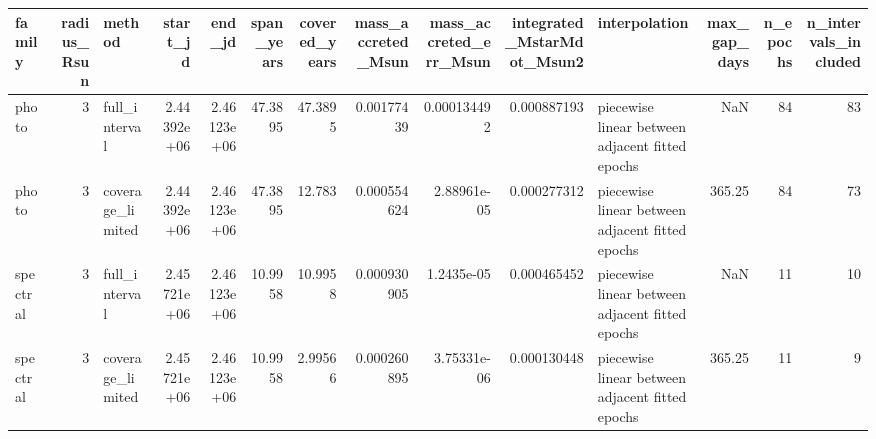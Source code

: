 \begin{tabular}{lrlrrrrrrrlrrr}
\toprule
family & radius_Rsun & method & start_jd & end_jd & span_years & covered_years & mass_accreted_Msun & mass_accreted_err_Msun & integrated_MstarMdot_Msun2 & interpolation & max_gap_days & n_epochs & n_intervals_included \\
\midrule
photo & 3 & full_interval & 2.44392e+06 & 2.46123e+06 & 47.3895 & 47.3895 & 0.00177439 & 0.000134492 & 0.000887193 & piecewise linear between adjacent fitted epochs & NaN & 84 & 83 \\
photo & 3 & coverage_limited & 2.44392e+06 & 2.46123e+06 & 47.3895 & 12.783 & 0.000554624 & 2.88961e-05 & 0.000277312 & piecewise linear between adjacent fitted epochs & 365.25 & 84 & 73 \\
spectral & 3 & full_interval & 2.45721e+06 & 2.46123e+06 & 10.9958 & 10.9958 & 0.000930905 & 1.2435e-05 & 0.000465452 & piecewise linear between adjacent fitted epochs & NaN & 11 & 10 \\
spectral & 3 & coverage_limited & 2.45721e+06 & 2.46123e+06 & 10.9958 & 2.99566 & 0.000260895 & 3.75331e-06 & 0.000130448 & piecewise linear between adjacent fitted epochs & 365.25 & 11 & 9 \\
\bottomrule
\end{tabular}
